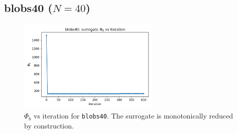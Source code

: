 \documentclass[11pt,a4paper]{article}
\numberwithin{equation}{section}
\newcommand{\phib}{\Phi_b}
\begin{document}
\subsection{blobs40 ($N{=}40$)}
\begin{figure}[h!]
\centering
\includegraphics[width=0.6\textwidth]{figures/blobs40_phib_vs_iter.png}
\caption{$\phib$ vs iteration for \texttt{blobs40}. The surrogate is monotonically reduced by construction.}
\label{fig:blobs40_iter}
\end{figure}
\end{document}
